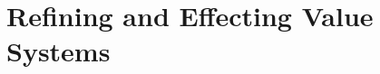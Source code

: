 \documentclass[10pt,titlepage]{book}
\begin{document}
\chapter{Refining and Effecting Value Systems}\label{refining-and-effecting-value-systems}


\backmatter




\clearpage
\listoftables

\clearpage
\listofposition
{}

\twocolumn[
]
{\small\printindex}

\vfil
\end{document}
